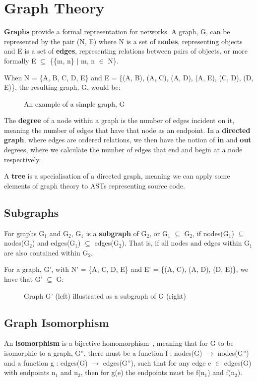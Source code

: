 \section{Graph Theory}
\label{section:graphs}
\textbf{Graphs} provide a formal representation for networks. A graph, G, can be represented by the pair (N, E) where N is a set of \textbf{nodes}, representing objects and E is a set of \textbf{edges}, representing relations between pairs of objects, or more formally E $\subseteq$ \{\{m, n\} $\mid$ m, n $\in$ N\}.

When N = \{A, B, C, D, E\} and E = \{(A, B), (A, C), (A, D), (A, E), (C, D), (D, E)\}, the resulting graph, G, would be:

\begin{figure}[H]
    \centering
    
    \caption{An example of a simple graph, G}
    \label{fig:example-graph}
\end{figure}

The \textbf{degree} of a node within a graph is the number of edges incident on it, meaning the number of edges that have that node as an endpoint. In a \textbf{directed graph}, where edges are ordered relations, we then have the notion of \textbf{in} and \textbf{out} degrees, where we calculate the number of edges that end and begin at a node respectively. 

A \textbf{tree} is a specialisation of a directed graph, meaning we can apply some elements of graph theory to ASTs representing source code.

\subsection{Subgraphs}
For graphs G$_1$ and G$_2$, G$_1$ is a \textbf{subgraph} of G$_2$, or G$_1$ $\subseteq$ G$_2$, if nodes(G$_1$) $\subseteq$ nodes(G$_2$) and edges(G$_1$) $\subseteq$ edges(G$_2$). That is, if all nodes and edges within G$_1$ are also contained within G$_2$. 

For a graph, G', with N' = \{A, C, D, E\} and E' = \{(A, C), (A, D), (D, E)\}, we have that G' $\subseteq$ G:

\begin{figure}[H]
    \centering
    
    \caption{Graph G' (left) illustrated as a subgraph of G (right)}
    \label{fig:example-subgraph}
\end{figure}

\subsection{Graph Isomorphism}
An \textbf{isomorphism} is a bijective homomorphism~\cite{LatticeTheory}, meaning that for G to be isomorphic to a graph, G'', there must be a function f : nodes(G) $\rightarrow$ nodes(G'') and a function g : edges(G) $\rightarrow$ edges(G''), such that for any edge e $\in$ edges(G) with endpoints n$_1$ and n$_2$, then for g(e) the endpoints must be f(n$_1$) and f(n$_2$). 

